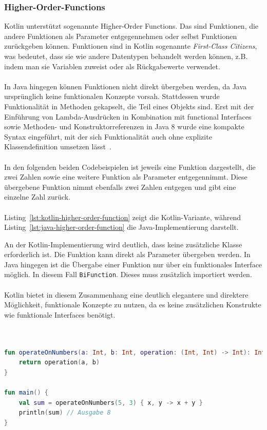 \documentclass[11pt]{article}
\begin{document}
    \subsubsection{Higher-Order-Functions}
    Kotlin unterstützt sogenannte Higher-Order Functions.
    Das sind Funktionen, die andere Funktionen als Parameter entgegennehmen oder selbst Funktionen zurückgeben können.
    Funktionen sind in Kotlin sogenannte \textit{First-Class Citizens}, was bedeutet, dass sie wie andere Datentypen behandelt werden können, z.B. indem man sie Variablen zuweist oder als Rückgabewerte verwendet.\\
    \\
    In Java hingegen können Funktionen nicht direkt übergeben werden, da Java ursprünglich keine funktionalen Konzepte vorsah.
    Stattdessen wurde Funktionalität in Methoden gekapselt, die Teil eines Objekts sind.
    Erst mit der Einführung von Lambda-Ausdrücken in Kombination mit functional Interfaces sowie Methoden- und Konstruktorreferenzen in Java 8 wurde eine kompakte Syntax eingeführt, mit der sich Funktionalität auch ohne explizite Klassendefinition umsetzen lässt~\cite[820]{insel}.\\
    \\
    In den folgenden beiden Codebeispielen ist jeweils eine Funktion dargestellt, die zwei Zahlen sowie eine weitere Funktion als Parameter entgegennimmt.
    Diese übergebene Funktion nimmt ebenfalls zwei Zahlen entgegen und gibt eine einzelne Zahl zurück.\\
    \\
    Listing~\ref{lst:kotlin-higher-order-function} zeigt die Kotlin-Variante, während Listing~\ref{lst:java-higher-order-function} die Java-Implementierung darstellt.

    An der Kotlin-Implementierung wird deutlich, dass keine zusätzliche Klasse erforderlich ist.
    Die Funktion kann direkt als Parameter übergeben werden.
    In Java hingegen ist die Übergabe einer Funktion nur über ein funktionales Interface möglich.
    In diesem Fall \texttt{BiFunction}.
    Dieses muss zusätzlich importiert werden.\\
    \\
    Kotlin bietet in diesem Zusammenhang eine deutlich elegantere und direktere Möglichkeit, funktionale Konzepte zu nutzen, da es keine zusätzlichen Konstrukte wie funktionale Interfaces benötigt.\\
    \\

    \begin{lstlisting}[language=Kotlin, caption={HigherOrderKotlin.kt}, label={lst:kotlin-higher-order-function}]

fun operateOnNumbers(a: Int, b: Int, operation: (Int, Int) -> Int): Int {
    return operation(a, b)
}

fun main() {
    val sum = operateOnNumbers(5, 3) { x, y -> x + y }
    println(sum) // Ausgabe 8
}
    \end{lstlisting}
\end{document}
